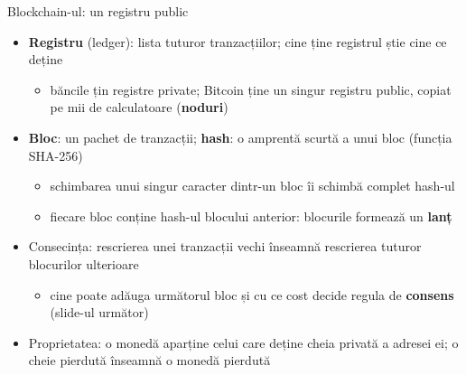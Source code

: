 \begin{frame}{Blockchain-ul: un registru public}
\itemsize{\small}
\begin{itemize}
    \item \textbf{Registru} (ledger): lista tuturor tranzacțiilor; cine ține registrul știe cine ce deține
    \begin{itemize}
        \item băncile țin registre private; Bitcoin ține un singur registru public, copiat pe mii de calculatoare (\textbf{noduri})
    \end{itemize}
    \item \textbf{Bloc}: un pachet de tranzacții; \textbf{hash}: o amprentă scurtă a unui bloc (funcția SHA-256)
    \begin{itemize}
        \item schimbarea unui singur caracter dintr-un bloc îi schimbă complet hash-ul
        \item fiecare bloc conține hash-ul blocului anterior: blocurile formează un \textbf{lanț}
    \end{itemize}
    \item Consecința: rescrierea unei tranzacții vechi înseamnă rescrierea tuturor blocurilor ulterioare
    \begin{itemize}
        \item cine poate adăuga următorul bloc și cu ce cost decide regula de \textbf{consens} (slide-ul următor)
    \end{itemize}
    \item Proprietatea: o monedă aparține celui care deține cheia privată a adresei ei; o cheie pierdută înseamnă o monedă pierdută
\end{itemize}
\end{frame}

